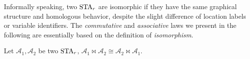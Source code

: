 Informally speaking, two $\mbox{STA}_r$ are isomorphic if they have the same graphical structure and homologous behavior, despite the slight difference of location labels or variable identifiers. The \emph{commutative} and \emph{associative} laws we present in the following are essentially based on the definition of \emph{isomorphism}.




\begin{theorem}[Commutative]
\label{thm:commutative}
Let $\mathscr{A}_1, \mathscr{A}_2$ be two $\mbox{STA}_r$, $\mathscr{A}_{1}\bowtie \mathscr{A}_{2}\cong\mathscr{A}_{2}\bowtie \mathscr{A}_{1}$.
\end{theorem}



